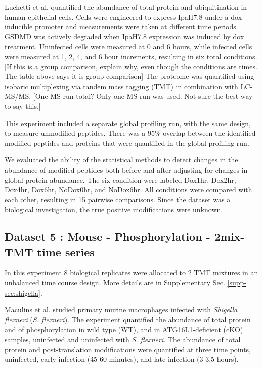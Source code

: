 \documentclass[mcp]{article}
\numberwithin{table}{section}
\def\todo#1{{\color{red}[#1]}}
\begin{document}
\medskip {} Luchetti et al. \cite{LUCHETTI2021} quantified the abundance of total protein and ubiquitination in human epithelial cells. Cells were engineered to express IpaH7.8 under a dox inducible promoter and measurements were taken at different time periods. GSDMD was actively degraded when IpaH7.8 expression was induced by dox treatment. Uninfected cells were measured at 0 and 6 hours, while infected cells were measured at 1, 2, 4, and 6 hour increments, resulting in six total conditions. \todo{If this is a group comparison, explain why, even though the conditions are times. The table above says it is group comparison} The proteome was quantified using isobaric multiplexing via tandem mass tagging (TMT) in combination with LC-MS/MS. \todo{One MS run total? Only one MS run was used. Not sure the best way to say this.}

\medskip {} This experiment included a separate global profiling run, with the same design, to measure unmodified peptides. There was a 95\% overlap between the identified modified peptides and proteins that were quantified in the global profiling run.

\medskip {} We evaluated the ability of the statistical methods to detect changes in the abundance of modified peptides both before and after adjusting for changes in global protein abundance. The six condition were labeled Dox1hr, Dox2hr, Dox4hr, Dox6hr, NoDox0hr, and NoDox6hr. All conditions were compared with each other, resulting in 15 pairwise comparisons. Since the dataset was a biological investigation, the true positive modifications were unknown.


\subsection*{Dataset 5 : Mouse - Phosphorylation - 2mix-TMT time series}
\label{sec:exp_proc_dataset5}
In this experiment 8 biological replicates were allocated to 2 TMT mixtures in an unbalanced time course design. More details are in Supplementary Sec. \ref{supp-sec:shigella}.


\medskip {} Maculins et al. \cite{Maculins} studied primary murine macrophages infected with {\it Shigella flexneri} ({\it S. flexneri}). The experiment quantified the abundance of total protein and of phosphorylation in wild type (WT), and in ATG16L1-deficient (cKO) samples, uninfected and uninfected with {\it S. flexneri}. The abundance of total protein and post-translation modifications were quantified at three time points, uninfected, early infection (45-60 minutes), and late infection (3-3.5 hours). 
\end{document}
